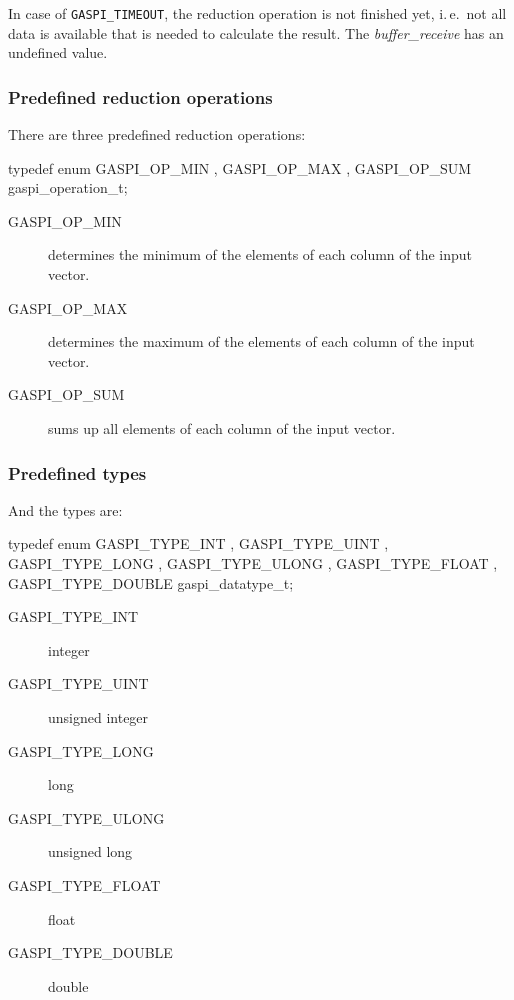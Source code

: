 \documentclass[a4paper]{article}
\newlength{\st}\setlength{\st}{0pt}
\newcommand{\zsep}[1]{#1}
\newcommand{\gaspiprefix}{gaspi}
\newcommand{\function}[1]{{\tt #1}}
\newcommand{\parameter}[1]{{\it #1}}
\newcommand{\gaspifunction}[1]{\function{\protect\zsep{\gaspiprefix\_#1}}}
\newcommand{\GASPITIME}{{\tt\protect\zsep{GASPI\_TIMEOUT}}}
\begin{document}

In case of \GASPITIME{}, the reduction operation is not finished yet,
i.\,e.\ not all data is available that is needed to calculate the
result. The \parameter{buffer\_receive} has an undefined value.

\subsubsection{Predefined reduction operations}

There are three predefined reduction operations:

\begin{listing}[99]{2}
typedef enum { GASPI_OP_MIN
             , GASPI_OP_MAX
             , GASPI_OP_SUM
             } gaspi_operation_t;
\end{listing}

\begin{description}
\item[GASPI\_OP\_MIN] determines the minimum of the elements of each column of the input vector.
\item[GASPI\_OP\_MAX] determines the maximum of the elements of each column of the input vector.
\item[GASPI\_OP\_SUM] sums up all elements of each column of the input vector.
\end{description}


\subsubsection{Predefined types}

And the types are:
\begin{listing}[99]{2}
typedef enum { GASPI_TYPE_INT
             , GASPI_TYPE_UINT
             , GASPI_TYPE_LONG
             , GASPI_TYPE_ULONG
             , GASPI_TYPE_FLOAT
             , GASPI_TYPE_DOUBLE
             } gaspi_datatype_t;
\end{listing}

\begin{description}
\item[GASPI\_TYPE\_INT] integer
\item[GASPI\_TYPE\_UINT] unsigned integer
\item[GASPI\_TYPE\_LONG] long
\item[GASPI\_TYPE\_ULONG] unsigned long
\item[GASPI\_TYPE\_FLOAT] float
\item[GASPI\_TYPE\_DOUBLE] double
\end{description}
\end{document}
